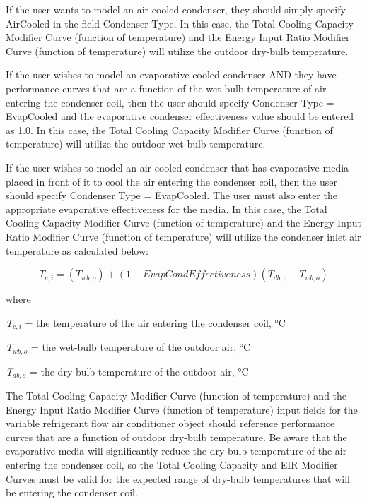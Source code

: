 If the user wants to model an air-cooled condenser, they should simply specify AirCooled in the field Condenser Type. In this case, the Total Cooling Capacity Modifier Curve (function of temperature) and the Energy Input Ratio Modifier Curve (function of temperature) will utilize the outdoor dry-bulb temperature.

If the user wishes to model an evaporative-cooled condenser AND they have performance curves that are a function of the wet-bulb temperature of air entering the condenser coil, then the user should specify Condenser Type = EvapCooled and the evaporative condenser effectiveness value should be entered as 1.0. In this case, the Total Cooling Capacity Modifier Curve (function of temperature) will utilize the outdoor wet-bulb temperature.

If the user wishes to model an air-cooled condenser that has evaporative media placed in front of it to cool the air entering the condenser coil, then the user should specify Condenser Type = EvapCooled. The user must also enter the appropriate evaporative effectiveness for the media. In this case, the Total Cooling Capacity Modifier Curve (function of temperature) and the Energy Input Ratio Modifier Curve (function of temperature) will utilize the condenser inlet air temperature as calculated below:

\begin{equation}
{T_{c,i}} = \left( {{T_{wb,o}}} \right) + \left( {1 - EvapCondEffectiveness} \right)\left( {{T_{db,o}} - {T_{wb,o}}} \right)
\end{equation}

where

\emph{T\(_{c,i}\)} = the temperature of the air entering the condenser coil, °C

\emph{T\(_{wb,o}\)} = the wet-bulb temperature of the outdoor air, °C

\emph{T\(_{db,o}\)} = the dry-bulb temperature of the outdoor air, °C

The Total Cooling Capacity Modifier Curve (function of temperature) and the Energy Input Ratio Modifier Curve (function of temperature) input fields for the variable refrigerant flow air conditioner object should reference performance curves that are a function of outdoor dry-bulb temperature. Be aware that the evaporative media will significantly reduce the dry-bulb temperature of the air entering the condenser coil, so the Total Cooling Capacity and EIR Modifier Curves must be valid for the expected range of dry-bulb temperatures that will be entering the condenser coil.

